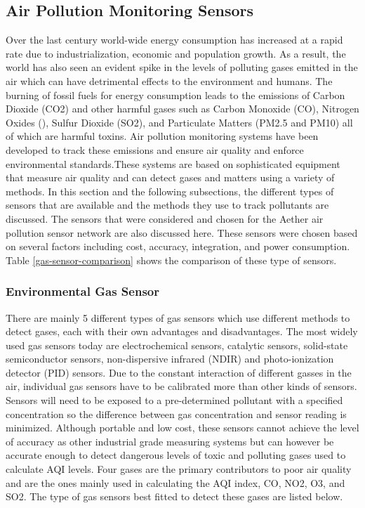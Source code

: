 \subsection{Air Pollution Monitoring Sensors}
Over the last century world-wide energy consumption has increased at a rapid rate due to industrialization, economic and population growth. As a result, the world has also seen an evident spike in the levels of polluting gases emitted in the air which can have detrimental effects to the environment and humans. The burning of fossil fuels for energy consumption leads to the emissions of Carbon Dioxide (CO2) and other harmful gases such as Carbon Monoxide (CO), Nitrogen Oxides (\nox), Sulfur Dioxide (SO2), and Particulate Matters (PM2.5 and PM10) all of which are harmful toxins. Air pollution monitoring systems have been developed to track these emissions and ensure air quality and enforce environmental standards.These systems are based on sophisticated equipment that measure air quality and can detect gases and matters using a variety of methods. In this section and the following subsections, the different types of sensors that are available and the methods they use to track pollutants are discussed. The sensors that were considered and chosen for the Aether air pollution sensor network are also discussed here. These sensors were chosen based on several factors including cost, accuracy, integration, and power consumption. Table \ref{gas-sensor-comparison} shows the comparison of these type of sensors.


\subsubsection{Environmental Gas Sensor}
There are mainly 5 different types of gas sensors which use different methods to detect gases, each with their own advantages and disadvantages. The most widely used gas sensors today are electrochemical sensors, catalytic sensors, solid-state semiconductor sensors, non-dispersive infrared (NDIR) and photo-ionization detector (PID) sensors. Due to the constant interaction of different gasses in the air, individual gas sensors have to be calibrated more than other kinds of sensors. Sensors will need to be exposed to a pre-determined pollutant with a specified concentration so the difference between gas concentration and sensor reading is minimized. Although portable and low cost, these sensors cannot achieve the level of accuracy as other industrial grade measuring systems but can however be accurate enough to detect dangerous levels of toxic and polluting gases used to calculate AQI levels. Four gases are the primary contributors to poor air quality and are the ones mainly used in calculating the AQI index, CO, NO2, O3, and SO2. The type of gas sensors best fitted to detect these gases are listed below. 

